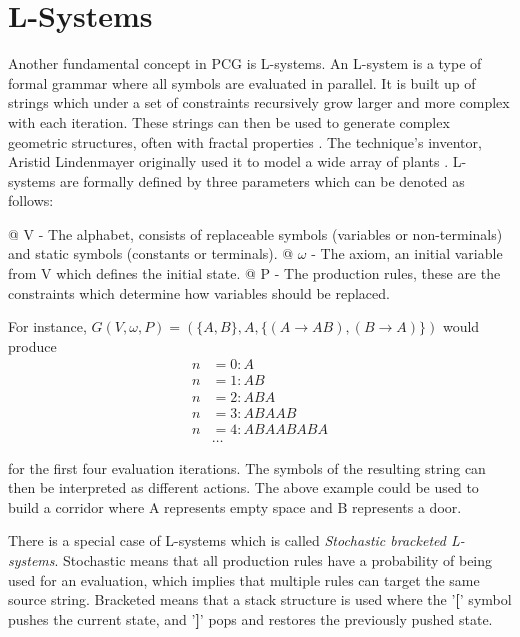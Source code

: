 \section{L-Systems}
\label{chap:lsystem}

Another fundamental concept in PCG is L-systems.
An L-system is a type of formal grammar where all symbols are evaluated in parallel.
It is built up of strings which under a set of constraints recursively grow larger and more complex with each iteration.
These strings can then be used to generate complex geometric structures, often with fractal properties \cite{wiki:fractals}.
The technique's inventor, Aristid Lindenmayer originally used it to model a wide array of plants \cite{lsystem_book}.
L-systems are formally defined by three parameters which can be denoted as follows:

\begin{easylist}
  @ V  - The alphabet, consists of replaceable symbols (variables or non-terminals) and static symbols (constants or terminals).
  @ $\omega$ - The axiom, an initial variable from V which defines the initial state.
  @ P - The production rules, these are the constraints which determine how variables should be replaced.
\end{easylist}

For instance, $G(V, \omega, P) = (\{A, B\}, A, \{(A \to AB), (B \to A)\})$ would produce
\begin{align*}
  n &= 0: A \\
  n &= 1: AB \\
  n &= 2: ABA \\
  n &= 3: ABAAB \\
  n &= 4: ABAABABA \\
  &\dots
\end{align*}
\vspace{-1.0cm}

for the first four evaluation iterations. The symbols of the resulting string can then be interpreted as different actions.
The above example could be used to build a corridor where A represents empty space and B represents a door.

There is a special case of L-systems which is called \textit{Stochastic bracketed L-systems}.
Stochastic means that all production rules have a probability of being used for an evaluation, which implies that multiple rules can target the same source string.
Bracketed means that a stack structure is used where the '\textbf{[}' symbol pushes the current state, and '\textbf{]}' pops and restores the previously pushed state.

